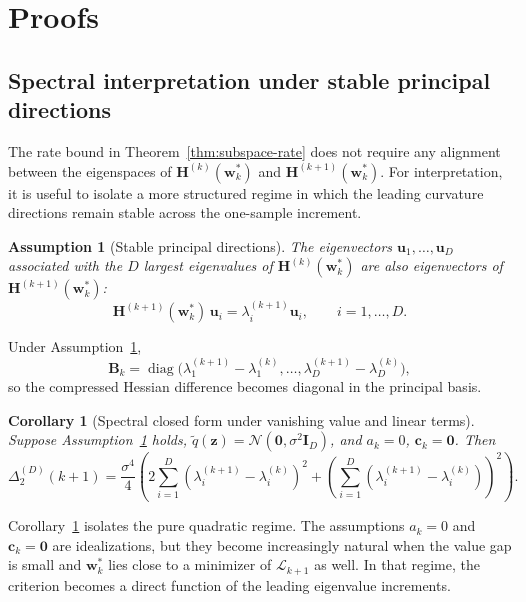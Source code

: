 \documentclass{article}
\newtheorem{assumption}{Assumption}
\newtheorem{corollary}[theorem]{Corollary}
\begin{document}
\section{Proofs}
\label{app:proofs}

\allowdisplaybreaks

\subsection{Spectral interpretation under stable principal directions}
\label{app:spectral}

The rate bound in Theorem~\ref{thm:subspace-rate} does not require any alignment between the eigenspaces of $\mathbf H^{(k)}(\mathbf w_k^*)$ and $\mathbf H^{(k+1)}(\mathbf w_k^*)$. For interpretation, it is useful to isolate a more structured regime in which the leading curvature directions remain stable across the one-sample increment.

\begin{assumption}[Stable principal directions]
\label{ass:stable-principal}
The eigenvectors $\mathbf u_1,\dots,\mathbf u_D$ associated with the $D$ largest eigenvalues of $\mathbf H^{(k)}(\mathbf w_k^*)$ are also eigenvectors of $\mathbf H^{(k+1)}(\mathbf w_k^*)$:
\[
\mathbf H^{(k+1)}(\mathbf w_k^*)\,\mathbf u_i
=
\lambda_i^{(k+1)}\mathbf u_i,
\qquad i=1,\dots,D.
\]
\end{assumption}

Under Assumption~\ref{ass:stable-principal},
\[
\mathbf B_k
=
\operatorname{diag}\bigl(
\lambda_1^{(k+1)}-\lambda_1^{(k)},
\dots,
\lambda_D^{(k+1)}-\lambda_D^{(k)}
\bigr),
\]
so the compressed Hessian difference becomes diagonal in the principal basis.

\begin{corollary}[Spectral closed form under vanishing value and linear terms]
\label{cor:spectral}
Suppose Assumption~\ref{ass:stable-principal} holds, $\tilde q(\mathbf z)=\mathcal N(\mathbf 0,\sigma^2\mathbf I_D)$, and $a_k=0$, $\mathbf c_k=\mathbf 0$. Then
\begin{equation}
\label{eq:spectral-closed-form}
\Delta_2^{(D)}(k+1)
=
\frac{\sigma^4}{4}
\left(
2\sum_{i=1}^D (\lambda_i^{(k+1)}-\lambda_i^{(k)})^2
+
\left(
\sum_{i=1}^D (\lambda_i^{(k+1)}-\lambda_i^{(k)})
\right)^2
\right).
\end{equation}
\end{corollary}

Corollary~\ref{cor:spectral} isolates the pure quadratic regime. The assumptions $a_k=0$ and $\mathbf c_k=\mathbf 0$ are idealizations, but they become increasingly natural when the value gap is small and $\mathbf w_k^*$ lies close to a minimizer of $\mathcal L_{k+1}$ as well. In that regime, the criterion becomes a direct function of the leading eigenvalue increments.
\end{document}
